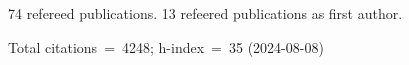 74 refereed publications. 13 refeered publications as first author.

Total citations~=~4248; h-index~=~35 (2024-08-08)